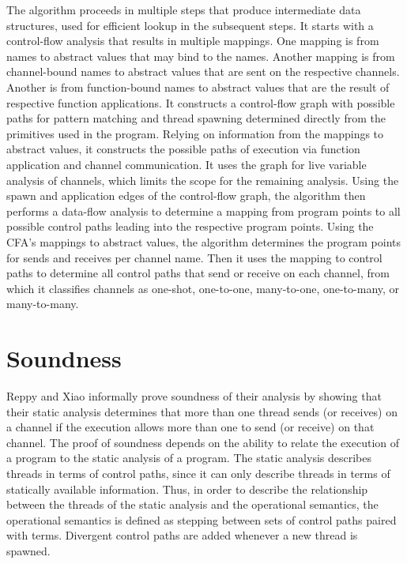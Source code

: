 \documentclass{article}
\begin{document}
The algorithm proceeds in multiple steps that produce intermediate data structures, used for
efficient lookup in the subsequent steps.  It starts with a control-flow analysis \cite{} that
results in multiple mappings. One mapping is from names to abstract values that may bind to
the names. Another mapping is from channel-bound names to abstract values that are
sent on the respective channels. Another is from function-bound names to abstract values
that are the result of respective function applications.  It constructs a control-flow graph 
with possible paths for pattern matching and thread spawning determined directly from the
primitives used in the program.  Relying on information from the mappings to abstract values,
it constructs the possible paths of execution via function application and channel
communication.  It uses the graph for live variable analysis of channels, which limits the
scope for the remaining analysis.  Using the spawn and application edges of the control-flow
graph, the algorithm then performs a data-flow analysis to determine a mapping from program
points to all possible control paths leading into the respective program points.  Using the
CFA's mappings to abstract values, the algorithm determines the program points for sends and
receives per channel name.  Then it uses the mapping to control paths to determine all
control paths that send or receive on each channel, from which it classifies channels as
one-shot, one-to-one, many-to-one, one-to-many, or many-to-many.

\section{Soundness}
Reppy and Xiao informally prove soundness of their analysis by showing that their static analysis
determines that more than one thread sends (or receives) on a channel if the execution allows more
than one to send (or receive) on that channel. The proof of soundness depends on the
ability to relate the execution of a program to the static analysis of a program. The static
analysis describes threads in terms of control paths, since it can only describe threads in
terms of statically available information. Thus, in order to describe the relationship between
the threads of the static analysis and the operational semantics, the operational semantics is
defined as stepping between sets of control paths paired with terms. Divergent control paths
are added whenever a new thread is spawned.
\end{document}
